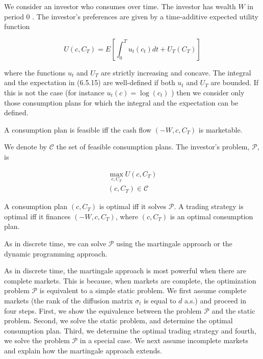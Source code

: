 \documentclass[\topdir/lecture\_notes.tex]{subfiles}
\begin{document}
We consider an investor who consumes over time. The investor has wealth $W$ in period 0 . The investor's preferences are given by a time-additive expected utility function

\begin{equation}
U\left(c, C_{T}\right)=E\left[\int_{0}^{T} u_{t}\left(c_{t}\right) d t+U_{T}\left(C_{T}\right)\right] \label{eq:6.5.15}
\end{equation}

where the functions $u_{t}$ and $U_{T}$ are strictly increasing and concave. The integral and the expectation in (6.5.15) are well-defined if both $u_{t}$ and $U_{T}$ are bounded. If this is not the case (for instance $u_{t}(c)=\log \left(c_{t}\right)$ ) then we consider only those consumption plans for which the integral and the expectation can be defined.

\begin{defn}\label{def:6.5.2}
A consumption plan is feasible iff the cash flow $\left(-W, c, C_{T}\right)$ is marketable.
\end{defn}

We denote by $\mathcal{C}$ the set of feasible consumption plans. The investor's problem, $\mathcal{P}$, is

\begin{equation}
\begin{gathered}
\max _{c, C_{T}} U\left(c, C_{T}\right) \\
\left(c, C_{T}\right) \in \mathcal{C}
\end{gathered}
\end{equation}

\begin{defn}\label{def:6.5.3}
A consumption plan $\left(c, C_{T}\right)$ is optimal iff it solves $\mathcal{P}$. A trading strategy is optimal iff it finances $\left(-W, c, C_{T}\right)$, where $\left(c, C_{T}\right)$ is an optimal consumption plan.
\end{defn}

As in discrete time, we can solve $\mathcal{P}$ using the martingale approach or the dynamic programming approach.

As in discrete time, the martingale approach is most powerful when there are complete markets. This is because, when markets are complete, the optimization problem $\mathcal{P}$ is equivalent to a simple static problem. We first assume complete markets (the rank of the diffusion matrix $\sigma_{t}$ is equal to $d$ a.s.) and proceed in four steps. First, we show the equivalence between the problem $\mathcal{P}$ and the static problem. Second, we solve the static problem, and determine the optimal consumption plan. Third, we determine the optimal trading strategy and fourth, we solve the problem $\mathcal{P}$ in a special case. We next assume incomplete markets and explain how the martingale approach extends.
\end{document}
